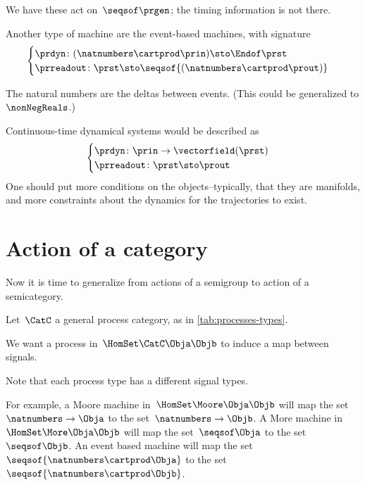 We have these act on~$\seqsof \prgen$; the timing information is not there.

Another type of machine are the event-based machines, with signature 
\begin{equation*}
  \begin{cases}
    \prdyn \colon (\natnumbers \cartprod \prin) \sto \Endof \prst \\
    \prreadout \colon \prst \sto \seqsof{ (\natnumbers \cartprod \prout)}
    \end{cases}    
\end{equation*}

The natural numbers are the deltas between events. (This could be generalized to $\nonNegReals$.)

Continuous-time dynamical systems would be described as 
% 
\begin{equation}
\begin{cases}
  \prdyn\colon \prin \to \vectorfield(\prst) \\
\prreadout\colon \prst \sto   \prout
\end{cases}
\end{equation}
% 
One should put more conditions on the objects--typically, that they are manifolds, and more constraints about the dynamics for the trajectories to exist.


\section{Action of a category}

Now it is time to generalize from actions of a semigroup to action of a semicategory. 

Let~$\CatC$ a general process category, as in \cref{tab:processes-types}.

We want a process in~$\HomSet\CatC\Obja\Objb$ to induce a map between signals.

Note that each process type has a different signal types. 

For example, a Moore machine in~$\HomSet\Moore\Obja\Objb$ will map the set~$\natnumbers \to \Obja$ to the set~$\natnumbers \to \Objb$.
A More machine in~$\HomSet\More\Obja\Objb$  will map the set~$\seqsof \Obja$ to the set~$\seqsof \Objb$.
An event based machine will map the set~$\seqsof{\natnumbers \cartprod \Obja}$ to the set~$\seqsof{\natnumbers \cartprod \Objb}$.

